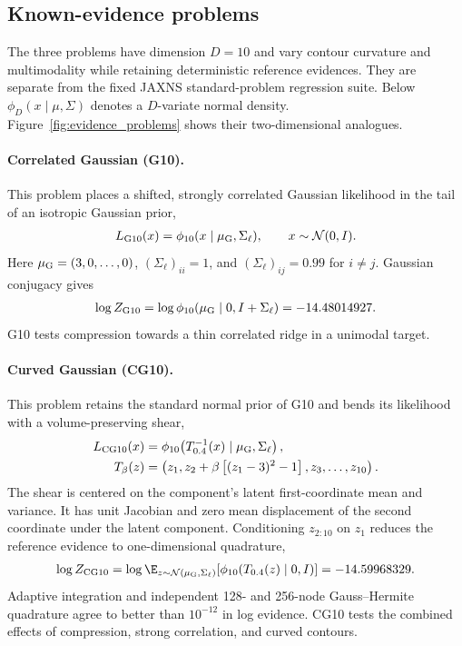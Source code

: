 \subsection{Known-evidence problems}

The three problems have dimension $D=10$ and vary contour curvature and multimodality while retaining deterministic reference evidences.
They are separate from the fixed JAXNS standard-problem regression suite.
Below $\phi_D(x\mid\mu,\Sigma)$ denotes a $D$-variate normal density.
Figure~\ref{fig:evidence_problems} shows their two-dimensional analogues.

\paragraph{Correlated Gaussian (G10).}
This problem places a shifted, strongly correlated Gaussian likelihood in the tail of an isotropic Gaussian prior,
\begin{align}
    L_{\rm G10}(x)=\phi_{10}(x\mid\mu_{\rm G},\Sigma_\ell),\qquad x\sim\mathcal{N}(0,I).
    \label{eq:g10_likelihood}
\end{align}
Here $\mu_{\rm G}=(3,0,\ldots,0)$, $(\Sigma_\ell)_{ii}=1$, and $(\Sigma_\ell)_{ij}=0.99$ for $i\ne j$.
Gaussian conjugacy gives
\begin{align}
    \log Z_{\rm G10}=\log\phi_{10}(\mu_{\rm G}\mid0,I+\Sigma_\ell)
    =-14.48014927. \label{eq:g10_evidence}
\end{align}
G10 tests compression towards a thin correlated ridge in a unimodal target.

\paragraph{Curved Gaussian (CG10).}
This problem retains the standard normal prior of G10 and bends its likelihood with a volume-preserving shear,
\begin{align}
    L_{\rm CG10}(x)&=\phi_{10}\!\left(T_{0.4}^{-1}(x)\mid\mu_{\rm G},\Sigma_\ell\right),
    \label{eq:cg10_likelihood}\\
    T_\beta(z)&=\left(z_1,z_2+\beta\left[(z_1-3)^2-1\right],z_3,\ldots,z_{10}\right).
\end{align}
The shear is centered on the component's latent first-coordinate mean and variance.
It has unit Jacobian and zero mean displacement of the second coordinate under the latent component.
Conditioning $z_{2:10}$ on $z_1$ reduces the reference evidence to one-dimensional quadrature,
\begin{align}
    \log Z_{\rm CG10}
    =\log\E_{z\sim\mathcal{N}(\mu_{\rm G},\Sigma_\ell)}
       \!\left[\phi_{10}(T_{0.4}(z)\mid0,I)\right]
    =-14.59968329. \label{eq:cg10_evidence}
\end{align}
Adaptive integration and independent 128- and 256-node Gauss--Hermite quadrature agree to better than $10^{-12}$ in log evidence.
CG10 tests the combined effects of compression, strong correlation, and curved contours.

